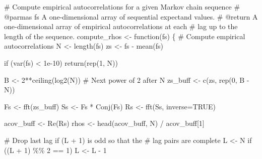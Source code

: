 \documentclass[
  letterpaper,
  DIV=11,
  numbers=noendperiod]{scrartcl}
\newenvironment{Shaded}{\begin{snugshade}}{\end{snugshade}}
\newcommand{\AttributeTok}[1]{\textcolor[rgb]{0.40,0.45,0.13}{#1}}
\newcommand{\CommentTok}[1]{\textcolor[rgb]{0.37,0.37,0.37}{#1}}
\newcommand{\ConstantTok}[1]{\textcolor[rgb]{0.56,0.35,0.01}{#1}}
\newcommand{\ControlFlowTok}[1]{\textcolor[rgb]{0.00,0.23,0.31}{#1}}
\newcommand{\DecValTok}[1]{\textcolor[rgb]{0.68,0.00,0.00}{#1}}
\newcommand{\FloatTok}[1]{\textcolor[rgb]{0.68,0.00,0.00}{#1}}
\newcommand{\FunctionTok}[1]{\textcolor[rgb]{0.28,0.35,0.67}{#1}}
\newcommand{\NormalTok}[1]{\textcolor[rgb]{0.00,0.23,0.31}{#1}}
\newcommand{\OtherTok}[1]{\textcolor[rgb]{0.00,0.23,0.31}{#1}}
\newcommand{\SpecialCharTok}[1]{\textcolor[rgb]{0.37,0.37,0.37}{#1}}
\begin{document}
\begin{Shaded}
\begin{Highlighting}[]
\CommentTok{\# Compute empirical autocorrelations for a given Markov chain sequence}
\CommentTok{\# @parmas fs A one{-}dimensional array of sequential expectand values.}
\CommentTok{\# @return A one{-}dimensional array of empirical autocorrelations at each }
\CommentTok{\#         lag up to the length of the sequence.}
\NormalTok{compute\_rhos }\OtherTok{\textless{}{-}} \ControlFlowTok{function}\NormalTok{(fs) \{}
  \CommentTok{\# Compute empirical autocorrelations}
\NormalTok{  N }\OtherTok{\textless{}{-}} \FunctionTok{length}\NormalTok{(fs)}
\NormalTok{  zs }\OtherTok{\textless{}{-}}\NormalTok{ fs }\SpecialCharTok{{-}} \FunctionTok{mean}\NormalTok{(fs)}
  
  \ControlFlowTok{if}\NormalTok{ (}\FunctionTok{var}\NormalTok{(fs) }\SpecialCharTok{\textless{}} \FloatTok{1e{-}10}\NormalTok{)}
    \FunctionTok{return}\NormalTok{(}\FunctionTok{rep}\NormalTok{(}\DecValTok{1}\NormalTok{, N))}

\NormalTok{  B }\OtherTok{\textless{}{-}} \DecValTok{2}\SpecialCharTok{**}\FunctionTok{ceiling}\NormalTok{(}\FunctionTok{log2}\NormalTok{(N)) }\CommentTok{\# Next power of 2 after N}
\NormalTok{  zs\_buff }\OtherTok{\textless{}{-}} \FunctionTok{c}\NormalTok{(zs, }\FunctionTok{rep}\NormalTok{(}\DecValTok{0}\NormalTok{, B }\SpecialCharTok{{-}}\NormalTok{ N))}

\NormalTok{  Fs }\OtherTok{\textless{}{-}} \FunctionTok{fft}\NormalTok{(zs\_buff)}
\NormalTok{  Ss }\OtherTok{\textless{}{-}}\NormalTok{ Fs }\SpecialCharTok{*} \FunctionTok{Conj}\NormalTok{(Fs)}
\NormalTok{  Rs }\OtherTok{\textless{}{-}} \FunctionTok{fft}\NormalTok{(Ss, }\AttributeTok{inverse=}\ConstantTok{TRUE}\NormalTok{)}

\NormalTok{  acov\_buff }\OtherTok{\textless{}{-}} \FunctionTok{Re}\NormalTok{(Rs)}
\NormalTok{  rhos }\OtherTok{\textless{}{-}} \FunctionTok{head}\NormalTok{(acov\_buff, N) }\SpecialCharTok{/}\NormalTok{ acov\_buff[}\DecValTok{1}\NormalTok{]}

  \CommentTok{\# Drop last lag if (L + 1) is odd so that the}
  \CommentTok{\# lag pairs are complete}
\NormalTok{  L }\OtherTok{\textless{}{-}}\NormalTok{ N}
  \ControlFlowTok{if}\NormalTok{ ((L }\SpecialCharTok{+} \DecValTok{1}\NormalTok{) }\SpecialCharTok{\%\%} \DecValTok{2} \SpecialCharTok{==} \DecValTok{1}\NormalTok{)}
\NormalTok{    L }\OtherTok{\textless{}{-}}\NormalTok{ L }\SpecialCharTok{{-}} \DecValTok{1}


\end{Highlighting}
\end{Shaded}
\end{document}
